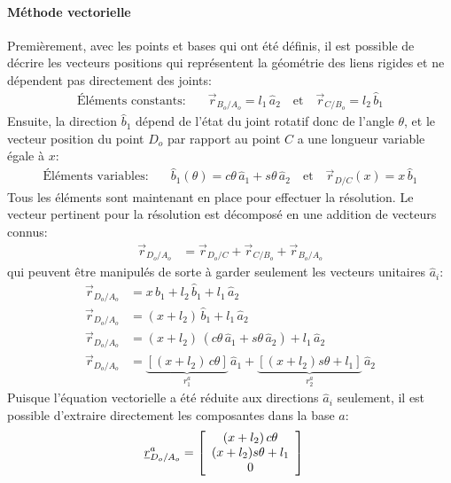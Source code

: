 \begin{example}
\paragraph{Méthode vectorielle}

Premièrement, avec les points et bases qui ont été définis, il est possible de décrire les vecteurs positions qui représentent la géométrie des liens rigides et ne dépendent pas directement des joints: 
\begin{align}
\text{Éléments constants:}& \quad \vec{r}_{B_o/A_o} = l_1 \, \hat{a}_2  \quad \text{et} \quad  \vec{r}_{C/B_o} = l_2 \, \hat{b}_1 
\end{align} 
Ensuite, la direction $\hat{b}_1$ dépend de l'état du joint rotatif donc de l'angle $\theta$, et le vecteur position du point $D_o$ par rapport au point $C$ a une longueur variable égale à $x$:
\begin{align}
\text{Éléments variables:}& \quad \hat{b}_1(\theta) = c\theta \, \hat{a}_1  + s\theta \, \hat{a}_2  \quad \text{et} \quad  \vec{r}_{D/C}(x) = x \, \hat{b}_1
\end{align} 
Tous les éléments sont maintenant en place pour effectuer la résolution. Le vecteur pertinent pour la résolution est décomposé en une addition de vecteurs connus:
\begin{align}
\vec{r}_{D_o/A_o}   &=  \vec{r}_{D_o/C} + \vec{r}_{C/B_o} + \vec{r}_{B_o/A_o} 
\end{align} 
qui peuvent être manipulés de sorte à garder seulement les vecteurs unitaires $\hat{a}_i$:
\begin{align}
\vec{r}_{D_o/A_o}   &=  x \, \hat{b}_1  + l_2 \, \hat{b}_1 + l_1 \, \hat{a}_2 \\
\vec{r}_{D_o/A_o}   &=            ( x + l_2 ) \, \hat{b}_1 + l_1 \, \hat{a}_2 \\
\vec{r}_{D_o/A_o}   &=  ( x + l_2 ) \, (  c\theta \, \hat{a}_1  + s\theta \, \hat{a}_2 ) + l_1 \, \hat{a}_2 \\
\vec{r}_{D_o/A_o}   &=  \underbrace{\left[  ( x + l_2 ) \, c\theta \right]}_{r_1^a}  \, \hat{a}_1  + \underbrace{\left[ ( x + l_2 ) s\theta  + l_1 \right]}_{r_2^a} \, \hat{a}_2 
\end{align} 
Puisque l'équation vectorielle a été réduite aux directions $\hat{a}_i$ seulement, il est possible d'extraire directement les composantes dans la base $a$:
\begin{align}
\underline{r}_{D_o/A_o}^a   &=  \left[ \begin{array}{c} 
( x + l_2 ) \, c\theta \\ ( x + l_2 ) s\theta  + l_1 \\ 0
\end{array} \right] 
\end{align} 


\end{example}
